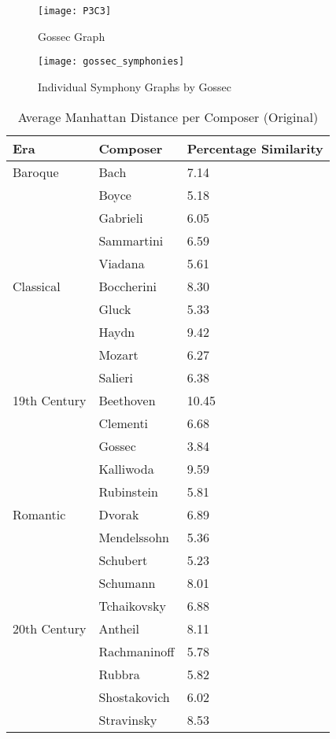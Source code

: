 \begin{figure}[H]
\caption{Gossec Graph}
\centering
\texttt{[image: P3C3]}
\end{figure}

\begin{figure}[H]
\caption{Individual Symphony Graphs by Gossec}
\centering
\texttt{[image: gossec\_symphonies]}
\end{figure}

\begin{longtable}{|l|l|l|}
\caption{Average Manhattan Distance per Composer (Original)}
\label{my-label}\\
\hline
Era & Composer & Percentage Similarity \\ \hline
\endfirsthead
%
\endhead
%
Baroque & Bach & 7.14 \\ \hline
 & Boyce & 5.18 \\ \hline
 & Gabrieli & 6.05 \\ \hline
 & Sammartini & 6.59 \\ \hline
 & Viadana & 5.61 \\ \hline
Classical & Boccherini & 8.30 \\ \hline
 & Gluck & 5.33 \\ \hline
 & Haydn & 9.42 \\ \hline
 & Mozart & 6.27 \\ \hline
 & Salieri & 6.38 \\ \hline
19th Century & Beethoven & 10.45 \\ \hline
 & Clementi & 6.68 \\ \hline
 & Gossec & 3.84 \\ \hline
 & Kalliwoda & 9.59 \\ \hline
 & Rubinstein & 5.81 \\ \hline
Romantic & Dvorak & 6.89 \\ \hline
 & Mendelssohn & 5.36 \\ \hline
 & Schubert & 5.23 \\ \hline
 & Schumann & 8.01 \\ \hline
 & Tchaikovsky & 6.88 \\ \hline
20th Century & Antheil & 8.11 \\ \hline
 & Rachmaninoff & 5.78 \\ \hline
 & Rubbra & 5.82 \\ \hline
 & Shostakovich & 6.02 \\ \hline
 & Stravinsky & 8.53 \\ \hline
\end{longtable}

